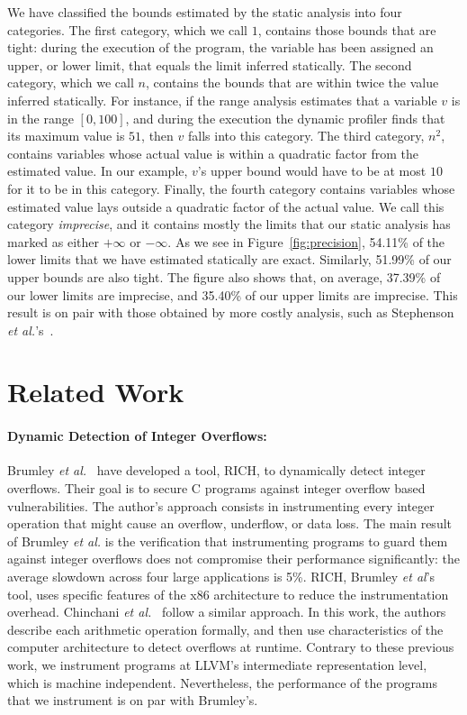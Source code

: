 \documentclass[preprint]{sigplanconf}[10pt]
\begin{document}
We have classified the bounds estimated by the static analysis into four
categories.
The first category, which we call $1$, contains those bounds that are tight:
during the execution of the program, the variable has been assigned an upper,
or lower limit, that equals the limit inferred statically.
The second category, which we call $n$, contains the bounds that are
within twice the value inferred statically.
For instance, if the range analysis estimates that a variable $v$ is in the
range $[0, 100]$, and during the execution the dynamic profiler finds that
its maximum value is $51$, then $v$ falls into this category.
The third category, $n^2$, contains variables whose actual value is within
a quadratic factor from the estimated value.
In our example, $v$'s upper bound would have to be at most $10$ for it to
be in this category.
Finally, the fourth category contains variables whose estimated value lays
outside a quadratic factor of the actual value.
We call this category {\em imprecise}, and it contains mostly the limits that
our static analysis has marked as either $+\infty$ or $-\infty$.
As we see in Figure~\ref{fig:precision}, 54.11\% of the lower limits that
we have estimated statically are exact.
Similarly, 51.99\% of our upper bounds are also tight.
The figure also shows that, on average, 37.39\% of our lower limits are
imprecise, and 35.40\% of our upper limits are imprecise.
This result is on pair with those obtained by more costly analysis, such as
Stephenson {\em et al.}'s~\cite{Stephenson00}.

\section{Related Work}
\label{sec:rel}

\noindent
\paragraph{Dynamic Detection of Integer Overflows: }
Brumley {\em et al.}~\cite{Brumley07} have developed a tool, RICH, to
dynamically detect integer overflows.
Their goal is to secure C programs against integer overflow based
vulnerabilities.
The author's approach consists in instrumenting every integer operation that
might cause an overflow, underflow, or data loss.
The main result of Brumley {\em et al.} is the verification that instrumenting
programs to guard them against integer overflows does not compromise their
performance significantly: the average slowdown across four large applications
is 5\%.
RICH, Brumley {\em et al}'s tool, uses specific features of the x86 architecture
to reduce the instrumentation overhead.
Chinchani {\em et al.}~\cite{Chinchani04} follow a similar approach.
In this work, the authors describe each arithmetic operation formally, and then
use characteristics of the computer architecture to detect overflows at
runtime.
Contrary to these previous work, we instrument programs at LLVM's intermediate
representation level, which is machine independent.
Nevertheless, the performance of the programs that we instrument is on par with
Brumley's.
\end{document}

